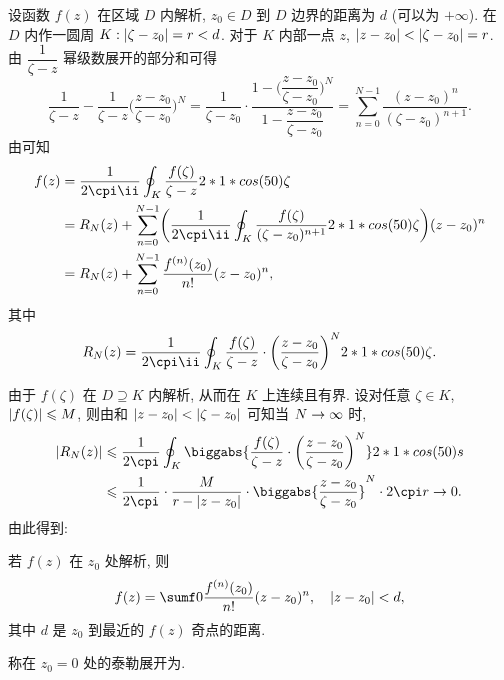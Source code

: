 设函数 $f(z)$ 在区域 $D$ 内解析, $z_0\in D$ 到 $D$ 边界的距离为 $d$ (可以为 $+\infty$).
在 $D$ 内作一圆周 $K:\left|\zeta-z_0\right|=r<d$.
对于 $K$ 内部一点 $z$, $\left|z-z_0\right|<\left|\zeta-z_0\right|=r$.
由 $\dfrac1{\zeta-z}$ 幂级数展开的部分和可得
\[
   \frac1{\zeta-z}-\frac1{\zeta-z}\biggl(\frac{z-z_0}{\zeta-z_0}\biggr)^N
  =\frac1{\zeta-z_0}\cdot\frac{1-\biggl(\dfrac{z-z_0}{\zeta-z_0}\biggr)^N}{1-\dfrac{z-z_0}{\zeta-z_0}}
  =\sum_{n=0}^{N-1}\frac{(z-z_0)^n}{(\zeta-z_0)^{n+1}}.
\]
由\thmCIH 可知
\begin{align*}
   f(z)&
  =\frac1{2\cpi\ii}\oint_K \frac{f(\zeta)}{\zeta-z}\d\zeta\\&
  =R_N(z)+\sum_{n=0}^{N-1}\biggl(\frac1{2\cpi\ii}\oint_K
      \frac{f(\zeta)}{(\zeta-z_0)^{n+1}}\d\zeta
    \biggr)(z-z_0)^n\\&
  =R_N(z)+\sum_{n=0}^{N-1}\frac{f^{(n)}(z_0)}{n!}(z-z_0)^n,
\end{align*}
其中
\[
   R_N(z)
  =\frac1{2\cpi\ii}\oint_K\frac{f(\zeta)}{\zeta-z}\cdot\biggl(\frac{z-z_0}{\zeta-z_0}\biggr)^N\d\zeta.
\]

由于 $f(\zeta)$ 在 $D\supseteq K$ 内解析, 从而在 $K$ 上连续且有界.
设对任意 $\zeta\in K$, $\left|f(\zeta)\right|\leqslant M$,
则由\thmGrowUp 和 $\left|z-z_0\right|<\left|\zeta-z_0\right|$ 可知当 $N\rightarrow\infty$ 时,
\begin{align*}
   \abs{R_N(z)}&
  \le\frac 1{2\cpi}\oint_K\biggabs{\frac{f(\zeta)}{\zeta-z}\cdot\biggl(\frac{z-z_0}{\zeta-z_0}\biggr)^N}\d s\\&
  \le\frac 1{2\cpi}\cdot \frac M{r-\abs{z-z_0}}\cdot\biggabs{\frac{z-z_0}{\zeta-z_0}}^N\cdot 2\cpi r\ra 0.
\end{align*}
由此得到:

\begin{theorem}
  若 $f(z)$ 在 $z_0$ 处解析, 则
  \[
    f(z)=\sumf0 \frac{f^{(n)}(z_0)}{n!}(z-z_0)^n,
      \quad \abs{z-z_0}<d,
  \]
  其中 $d$ 是 $z_0$ 到最近的 $f(z)$ 奇点的距离.\footnotemark
\end{theorem}

称在 $z_0=0$ 处的泰勒展开为.

